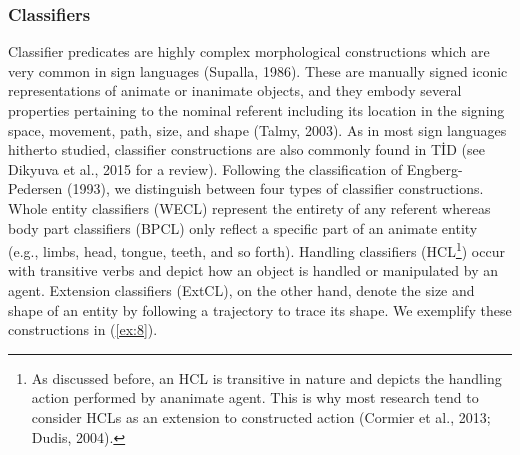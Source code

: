 \documentclass[]{elsarticle} %
\begin{document}
\hypertarget{classifiers}{%
\subsubsection{Classifiers}\label{classifiers}}

Classifier predicates are highly complex morphological constructions
which are very common in sign languages (Supalla, 1986). These are
manually signed iconic representations of animate or inanimate objects,
and they embody several properties pertaining to the nominal referent
including its location in the signing space, movement, path, size, and
shape (Talmy, 2003). As in most sign languages hitherto studied,
classifier constructions are also commonly found in TİD (see Dikyuva et
al., 2015 for a review). Following the classification of
Engberg-Pedersen (1993), we distinguish between four types of classifier
constructions. Whole entity classifiers (WECL) represent the entirety of
any referent whereas body part classifiers (BPCL) only reflect a
specific part of an animate entity (e.g., limbs, head, tongue, teeth,
and so forth). Handling classifiers (HCL\footnote{As discussed before,
  an HCL is transitive in nature and depicts the handling action
  performed by ananimate agent. This is why most research tend to
  consider HCLs as an extension to constructed action (Cormier et al.,
  2013; Dudis, 2004).}) occur with transitive verbs and depict how an
object is handled or manipulated by an agent. Extension classifiers
(ExtCL), on the other hand, denote the size and shape of an entity by
following a trajectory to trace its shape. We exemplify these
constructions in (\ref{ex:8}).
\end{document}
